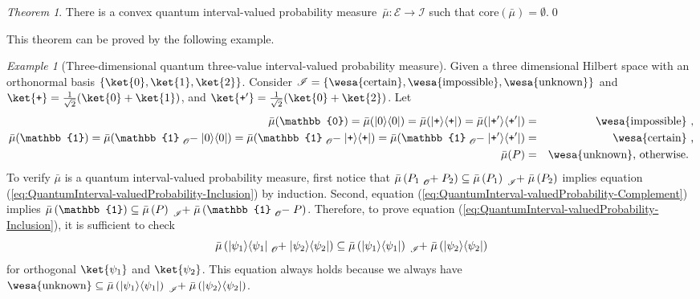 \documentclass{article}
\theoremstyle{remark}
\newtheorem{example}{Example}
\newtheorem{thm}{Theorem}
\newcommand{\events}{\ensuremath{\mathcal{E}}}
\newcommand{\proj}[1]{|#1 \rangle\langle #1 |}
\newcommand{\ps}{\texttt{+}}
\newcommand{\imposs}{{\mbox{\wesa{impossible}}}}
\newcommand{\necess}{{\mbox{\wesa{certain}}}}
\newcommand{\unknown}{{\mbox{\wesa{unknown}}}}
\begin{document}
\begin{thm}\label{def:EmptyCoreQuantumInterval-valuedProbability}
There is a convex quantum interval-valued probability measure~$\bar{\mu}:\events\rightarrow\mathscr{I}$
such that $\mathrm{core}\left(\bar{\mu}\right)=\emptyset$.\qed\end{thm}

This theorem can be proved by the following example. 

\begin{example}[Three-dimensional quantum three-value interval-valued
probability measure]\label{ex:three-dimensional-three-value} Given
a three dimensional Hilbert space with an orthonormal basis $\left\{ \ket{0},\ket{1},\ket{2}\right\} $.
Consider\emph{ $\mathscr{I}=\left\{ \necess,\imposs,\unknown\right\} $}
and $\ket{\ps}=\frac{1}{\sqrt{2}}(\ket{0}+\ket{1})$, and $\ket{\ps'}=\frac{1}{\sqrt{2}}(\ket{0}+\ket{2})$.
Let 
\begin{eqnarray*}
\bar{\mu}(\mathbb{0})=\bar{\mu}(\proj{0})=\bar{\mu}(\proj{\ps})=\bar{\mu}(\proj{\ps'}) & = & \imposs\textrm{ ,}\\
\bar{\mu}(\mathbb{1})=\bar{\mu}(\mathbb{1}\tensor*[_{\mathscr{O}}]{-}{}\proj{0})=\bar{\mu}(\mathbb{1}\tensor*[_{\mathscr{O}}]{-}{}\proj{\ps})=\bar{\mu}(\mathbb{1}\tensor*[_{\mathscr{O}}]{-}{}\proj{\ps'}) & = & \necess\textrm{ ,}\\
\bar{\mu}(P) & = & \unknown\textrm{, otherwise. }
\end{eqnarray*}
To verify $\bar{\mu}$ is a quantum interval-valued probability measure,
first notice that $\bar{\mu}\left(P_{1}\tensor*[_{\mathscr{O}}]{+}{}P_{2}\right)\subseteq\bar{\mu}\left(P_{1}\right)\tensor*[_{\mathscr{I}}]{+}{}\bar{\mu}\left(P_{2}\right)$
implies equation (\ref{eq:QuantumInterval-valuedProbability-Inclusion})
by induction. Second, equation (\ref{eq:QuantumInterval-valuedProbability-Complement})
implies $\bar{\mu}\left(\mathbb{1}\right)\subseteq\bar{\mu}\left(P\right)\tensor*[_{\mathscr{I}}]{+}{}\bar{\mu}\left(\mathbb{1}\tensor*[_{\mathscr{O}}]{-}{}P\right)$.
Therefore, to prove equation (\ref{eq:QuantumInterval-valuedProbability-Inclusion}),
it is sufficient to check 
\[
\bar{\mu}\left(\proj{\psi_{1}}\tensor*[_{\mathscr{O}}]{+}{}\proj{\psi_{2}}\right)\subseteq\bar{\mu}\left(\proj{\psi_{1}}\right)\tensor*[_{\mathscr{I}}]{+}{}\bar{\mu}\left(\proj{\psi_{2}}\right)
\]
for orthogonal $\ket{\psi_{1}}$ and $\ket{\psi_{2}}$. This equation
always holds because we always have $\unknown\subseteq\bar{\mu}\left(\proj{\psi_{1}}\right)\tensor*[_{\mathscr{I}}]{+}{}\bar{\mu}\left(\proj{\psi_{2}}\right)$.


\end{example}
\end{document}
